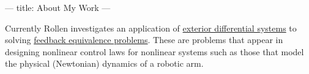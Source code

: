 ---
title: About My Work
---

Currently Rollen investigates an application of \href{https://en.wikipedia.org/wiki/Differential_ideal}{exterior differential systems} to solving \href{https://en.wikipedia.org/wiki/Feedback_linearization}{feedback equivalence problems}.
These are problems that appear in designing nonlinear control laws for nonlinear systems such as those that model the physical (Newtonian) dynamics of a robotic arm.
